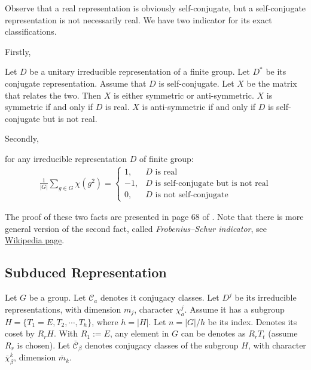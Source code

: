 Observe that a real representation is obviously self-conjugate, but a
self-conjugate representation is not necessarily real. We have two
indicator for its exact classifications.

Firstly,
\begin{thm}
    Let $D$ be a unitary irreducible representation of a finite group.
    Let $D^*$ be its conjugate representation. Assume that $D$ is
    self-conjugate. Let $X$ be the matrix that relates the two. Then
    $X$ is either symmetric or anti-symmetric. $X$ is symmetric if and
    only if $D$ is real. $X$ is anti-symmetric if and only if $D$ is
    self-conjugate but is not real.
\end{thm}

Secondly, 
\begin{thm}
    for any irreducible representation $D$ of finite group:
    \begin{align}
        \frac{1}{|G|}\sum_{g\in G} \chi(g^2) = \begin{cases}
            1, & \text{$D$ is real} \\
            -1, & \text{$D$ is self-conjugate but is not real} \\
            0, & \text{$D$ is not self-conjugate}
        \end{cases}
    \end{align}
\end{thm}

The proof of these two facts are presented in page 68 of \cite{book}.
Note that there is more general version of the second fact, called
\textit{Frobenius–Schur indicator}, see
\href{https://en.wikipedia.org/wiki/Frobenius%E2%80%93Schur_indicator}
{Wikipedia page}.

\subsection{Subduced Representation}
\label{sec:Subduced-Representation}
Let $G$ be a group. Let $\mathcal{C}_a$ denotes it conjugacy classes.
Let $D^j$ be its irreducible representations, with dimension $m_j$,
character $\chi^j_a$. Assume it has a subgroup $H=\{T_1=E,
T_2,\cdots,T_h\}$, where $h=|H|$. Let $n=|G|/h$ be its index. Denotes
its coset by $R_rH$. With $R_1:=E$, any element in $G$ can be denotes
as $R_r T_t$ (assume $R_r$ is chosen). Let $\bar{\mathcal{C}}_\beta$
denotes conjugacy classes of the subgroup $H$, with character
$\bar{\chi}^k_\beta$, dimension $\bar{m}_k$.

